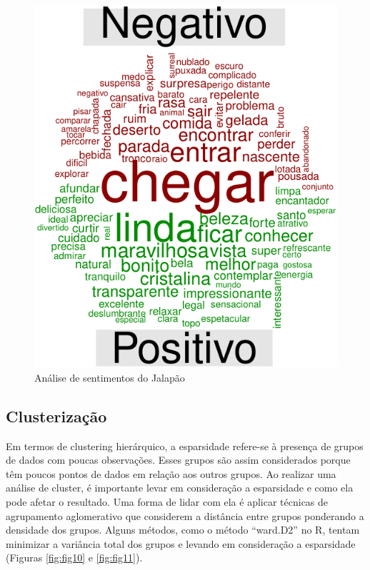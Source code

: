 \documentclass[preprint, 3p,
authoryear]{elsarticle} %
\begin{document}
\begin{figure}[H]

{\centering \includegraphics{bookdown-artigo_files/figure-latex/fig9-1} 

}

\caption{Análise de sentimentos do Jalapão}\label{fig:fig9}
\end{figure}

\hypertarget{clusterizauxe7uxe3o}{%
\subsection{Clusterização}\label{clusterizauxe7uxe3o}}

Em termos de clustering hierárquico, a esparsidade refere-se à presença
de grupos de dados com poucas observações. Esses grupos são assim
considerados porque têm poucos pontos de dados em relação aos outros
grupos. Ao realizar uma análise de cluster, é importante levar em
consideração a esparsidade e como ela pode afetar o resultado. Uma forma
de lidar com ela é aplicar técnicas de agrupamento aglomerativo que
considerem a distância entre grupos ponderando a densidade dos grupos.
Alguns métodos, como o método ``ward.D2'' no R, tentam minimizar a
variância total dos grupos e levando em consideração a esparsidade
(Figuras \ref{fig:fig10} e \ref{fig:fig11}).
\end{document}
